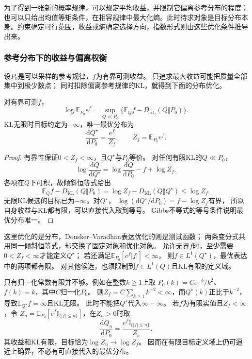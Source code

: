 为了得到一张新的概率规律，可以规定平均收益，并限制它偏离参考分布的程度；也可以只给出均值等矩条件，在相容规律中最大化熵。此时待求对象是目标分布本身。约束确定可行范围，收益或熵确定选择方向，指数形式则由这些优化条件推导出来。

\subsubsection{参考分布下的收益与偏离权衡}
\label{sec:information-gibbs-optimization}

设\(P_0\)是可以采样的参考规律，\(f\)为有界可测收益。
只追求最大收益可能把质量全部集中到极少数点；
同时扣除偏离参考规律的KL，就得到下面的分布优化。
\begin{theorem}[Gibbs变分式]
\label{thm:information-gibbs-variational}
对有界可测\(f\)，
\begin{equation}
  \log\mathbb E_{P_0}e^f
  =\sup_{Q\ll P_0}\{\mathbb E_Qf-D_{\mathrm{KL}}(Q\Vert P_0)\}.
  \label{eq:information-gibbs-variational}
\end{equation}
KL无限时目标约定为\(-\infty\)，唯一最优分布为
\[
  \frac{\mathrm dQ^\star}{\mathrm dP_0}
  =\frac{e^f}{Z_f},\qquad Z_f=\mathbb E_{P_0}e^f.
\]
\end{theorem}
\begin{proof}
有界性保证\(0<Z_f<\infty\)，且\(Q^\star\)与\(P_0\)等价。
对任何有限KL的\(Q\ll P_0\)，
\[
  \log\frac{\mathrm dQ}{\mathrm dQ^\star}
  =\log\frac{\mathrm dQ}{\mathrm dP_0}-f+\log Z_f.
\]
各项在\(Q\)下可积，故倾斜恒等式给出
\[
  \mathbb E_Qf-D_{\mathrm{KL}}(Q\Vert P_0)
  =\log Z_f-D_{\mathrm{KL}}(Q\Vert Q^\star)\leq\log Z_f.
\]
无限KL候选的目标已为\(-\infty\)。对\(Q^\star\)，
\(\log(\mathrm dQ^\star/\mathrm dP_0)=f-\log Z_f\)有界，
所以自身收益与KL都有限，可以直接代入取到等号。
Gibbs不等式的等号条件说明最优分布唯一。
\end{proof}

这里优化的是分布，Donsker--Varadhan表达优化的则是测试函数；
两条变分式共用同一倾斜恒等式，却交换了固定对象和优化对象。
允许无界\(f\)时，至少需要\(0<Z_f<\infty\)才能定义\(Q^\star\)；
若还满足\(\mathbb E_{P_0}[e^f|f|]<\infty\)，
则\(f\in L^1(Q^\star)\)，最优表达中的两项都有限。
对其他候选，也须限制到\(f\in L^1(Q)\)且KL有限的定义域。

只有归一化常数有限并不够。例如在整数\(k\geq1\)上取
\(P_0(k)=C e^{-k}/k^2\)、\(f(k)=k\)，其中\(C\)归一化\(P_0\)。
则\(Z_f=C\sum_{k\geq1}k^{-2}<\infty\)，而\(Q^\star(k)\)正比于\(k^{-2}\)，
导致\(\mathbb E_{Q^\star}f=\infty\)且KL无限。
此时不能把\(Q^\star\)代入\(\infty-\infty\)。
若\(f\)为有限实值且\(Z_f<\infty\)，令
\(Z_n=\mathbb E_{P_0}[e^f\mathbb I_{\{|f|\leq n\}}]\)，在\(Z_n>0\)时取
\[
  \frac{\mathrm dQ_n}{\mathrm dP_0}
  =\frac{e^f\mathbb I_{\{|f|\leq n\}}}{Z_n}.
\]
其收益和KL有限，目标恰为\(\log Z_n\to\log Z_f\)。
因而在有限目标定义域上仍可逼近上确界，不必有可直接代入的最优分布。


